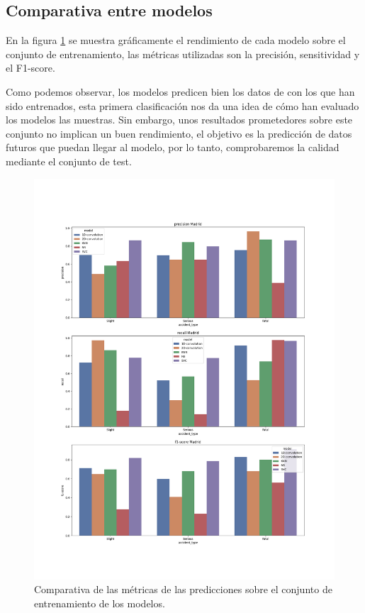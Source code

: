   \subsection{Comparativa entre modelos}

  En la figura \ref{ResultsTrainImage} se muestra gráficamente el rendimiento de cada modelo sobre el conjunto de entrenamiento, las métricas utilizadas son la precisión, sensitividad y el F1-score.

  Como podemos observar, los modelos predicen bien los datos de con los que han sido entrenados, esta primera clasificación nos da una idea de cómo han evaluado los modelos las muestras. Sin embargo, unos resultados prometedores sobre este conjunto no implican un buen rendimiento, el objetivo es la predicción de datos futuros que puedan llegar al modelo, por lo tanto, comprobaremos la calidad mediante el conjunto de test.

  \begin{figure}[h]
      \centering
      \includegraphics[width=16cm]{archivos/5.Resultados/ComparativaTrain}
      \caption{Comparativa de las métricas de las predicciones sobre el conjunto de entrenamiento de los modelos.}
      \label{ResultsTrainImage}
   \end{figure}



